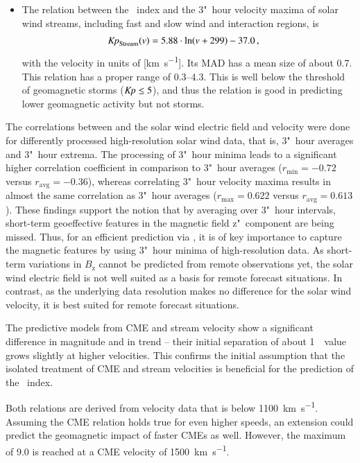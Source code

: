 \begin{itemize}
	\pagebreak

	\item The relation between the \Kp~index and the 3"~hour velocity maxima of solar wind streams, including fast and slow wind and interaction regions, is
	\begin{align*}
		\text{\Kp}_\text{Stream}(v) &= 5.88 \cdot \ln(v + 299) - 37.0	\,,
	\end{align*}
	with the velocity in units of [\si{\km\per\s}]. Its MAD has a mean \Kp{} size of about \num{0.7}. This relation has a proper \Kp{} range of \numrange{0.3}{4.3}. This is well below the threshold of geomagnetic storms ($\si{\Kp} \leq 5$), and thus the relation is good in predicting lower geomagnetic activity but not storms.
\end{itemize}

\medskip

The correlations between \Kp{} and the solar wind electric field and velocity were done for differently processed high-resolution solar wind data, that is, 3"~hour averages and 3"~hour extrema. The processing of 3"~hour \vBz{} minima leads to a significant higher correlation coefficient in comparison to 3"~hour averages ($r_\text{min} = -0.72$ versus $r_\text{avg} = -0.36$), whereas correlating 3"~hour velocity maxima results in almost the same correlation as 3"~hour averages ($r_\text{max} = 0.622$ versus $r_\text{avg} = 0.613$).
These findings support the notion that by averaging over 3"~hour intervals, short-term geoeffective features in the magnetic field z"~component are being missed. Thus, for an efficient \Kp{} prediction via \vBz{}, it is of key importance to capture the magnetic features by using 3"~hour minima of high-resolution data. As short-term variations in $B_\text{z}$ cannot be predicted from remote observations yet, the solar wind electric field is not well suited as a basis for remote forecast situations.
In contrast, as the underlying data resolution makes no difference for the solar wind velocity, it is best suited for remote forecast situations.

The \Kp{} predictive models from CME and stream velocity show a significant difference in magnitude and in trend -- their initial separation of about 1~\Kp~value grows slightly at higher velocities. This confirms the initial assumption that the isolated treatment of CME and stream velocities is beneficial for the prediction of the \Kp~index.

Both relations are derived from velocity data that is below \SI{1100}{\km\per\s}. Assuming the CME relation holds true for even higher speeds, an extension could predict the geomagnetic impact of faster CMEs as well. However, the maximum \Kp{} of \num{9.0} is reached at a CME velocity of \SI{1500}{\km\per\s}.

